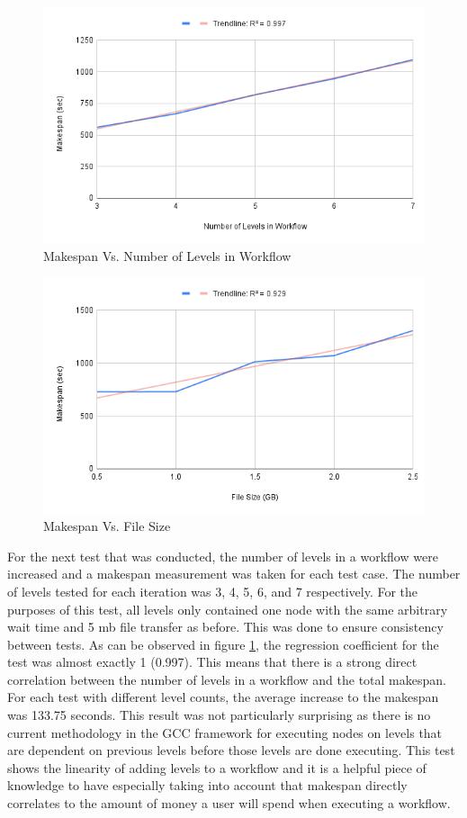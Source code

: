 \documentclass[fleqn,10pt]{SelfArx} %
\begin{document}
\begin{figure}[t]
\centering
\includegraphics[width=\linewidth]{Figures/makespan_vs_levelcount.png}
\caption{Makespan Vs. Number of Levels in Workflow}
\label{fig:tr2}
\end{figure}

\begin{figure}[t]
\centering
\includegraphics[width=\linewidth]{Figures/makespan_vs_filesize.png}
\caption{Makespan Vs. File Size}
\label{fig:tr3}
\end{figure}

For the next test that was conducted, the number of levels in a workflow were increased and a makespan measurement was taken for each test case. The number of levels tested for each iteration was 3, 4, 5, 6, and 7 respectively. For the purposes of this test, all levels only contained one node with the same arbitrary wait time and 5 mb file transfer as before. This was done to ensure consistency between tests. As can be observed in figure \ref{fig:tr2}, the regression coefficient for the test was almost exactly 1 (0.997). This means that there is a strong direct correlation between the number of levels in a workflow and the total makespan. For each test with different level counts, the average increase to the makespan was 133.75 seconds. This result was not particularly surprising as there is no current methodology in the GCC framework for executing nodes on levels that are dependent on previous levels before those levels are done executing. This test shows the linearity of adding levels to a workflow and it is a helpful piece of knowledge to have especially taking into account that makespan directly correlates to the amount of money a user will spend when executing a workflow.
\end{document}
